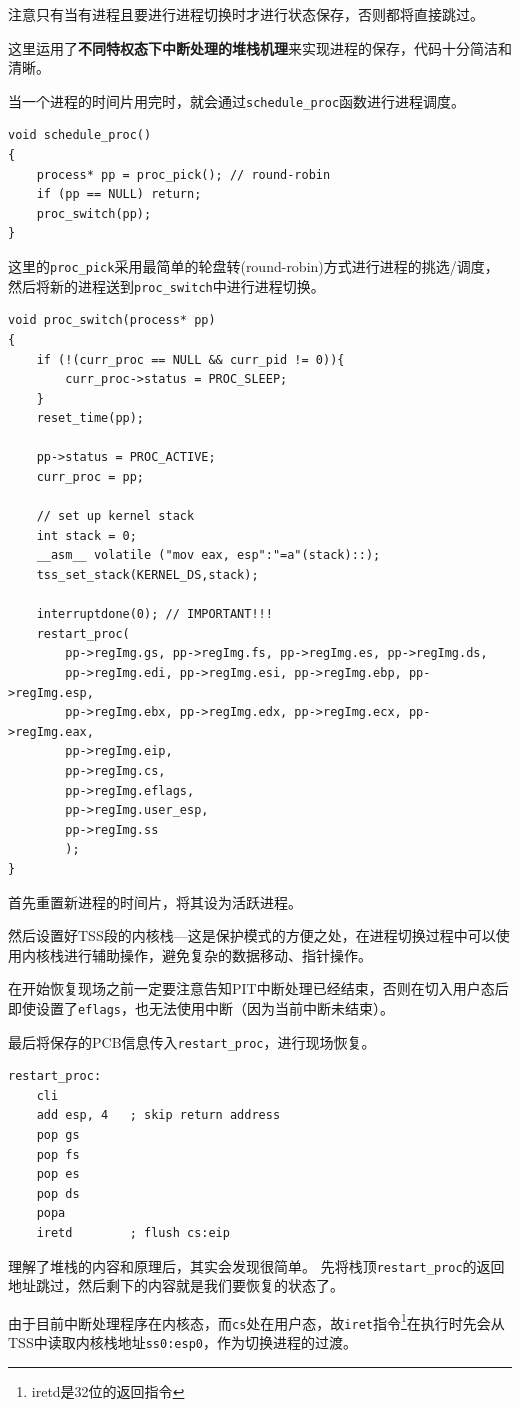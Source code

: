 \documentclass[logo,reportComp]{thesis}
\begin{document}
注意只有当有进程且要进行进程切换时才进行状态保存，否则都将直接跳过。

这里运用了\textbf{不同特权态下中断处理的堆栈机理}来实现进程的保存，代码十分简洁和清晰。

当一个进程的时间片用完时，就会通过\verb'schedule_proc'函数进行进程调度。
\begin{lstlisting}
void schedule_proc()
{
	process* pp = proc_pick(); // round-robin
	if (pp == NULL) return;
	proc_switch(pp);
}
\end{lstlisting}

这里的\verb'proc_pick'采用最简单的轮盘转(round-robin)方式进行进程的挑选/调度，然后将新的进程送到\verb'proc_switch'中进行进程切换。
\begin{lstlisting}
void proc_switch(process* pp)
{
	if (!(curr_proc == NULL && curr_pid != 0)){
		curr_proc->status = PROC_SLEEP;
	}
	reset_time(pp);

	pp->status = PROC_ACTIVE;
	curr_proc = pp;

	// set up kernel stack
	int stack = 0;
	__asm__ volatile ("mov eax, esp":"=a"(stack)::);
	tss_set_stack(KERNEL_DS,stack);

	interruptdone(0); // IMPORTANT!!!
	restart_proc(
		pp->regImg.gs, pp->regImg.fs, pp->regImg.es, pp->regImg.ds,
		pp->regImg.edi, pp->regImg.esi, pp->regImg.ebp, pp->regImg.esp,
		pp->regImg.ebx, pp->regImg.edx, pp->regImg.ecx, pp->regImg.eax,
		pp->regImg.eip,
		pp->regImg.cs,
		pp->regImg.eflags,
		pp->regImg.user_esp,
		pp->regImg.ss
		);
}
\end{lstlisting}

首先重置新进程的时间片，将其设为活跃进程。

然后设置好TSS段的内核栈---这是保护模式的方便之处，在进程切换过程中可以使用内核栈进行辅助操作，避免复杂的数据移动、指针操作。

在开始恢复现场之前一定要注意告知PIT中断处理已经结束，否则在切入用户态后即使设置了\verb'eflags'，也无法使用中断（因为当前中断未结束）。

最后将保存的PCB信息传入\verb'restart_proc'，进行现场恢复。
\begin{lstlisting}[language={[x86masm]Assembler}]
restart_proc:
	cli
	add esp, 4   ; skip return address
	pop gs
	pop fs
	pop es
	pop ds
	popa
	iretd        ; flush cs:eip
\end{lstlisting}

理解了堆栈的内容和原理后，其实会发现很简单。
先将栈顶\verb'restart_proc'的返回地址跳过，然后剩下的内容就是我们要恢复的状态了。

由于目前中断处理程序在内核态，而\verb'cs'处在用户态，故\verb'iret'指令\footnote{iretd是32位的返回指令}在执行时先会从TSS中读取内核栈地址\verb'ss0:esp0'，作为切换进程的过渡。
\end{document}
